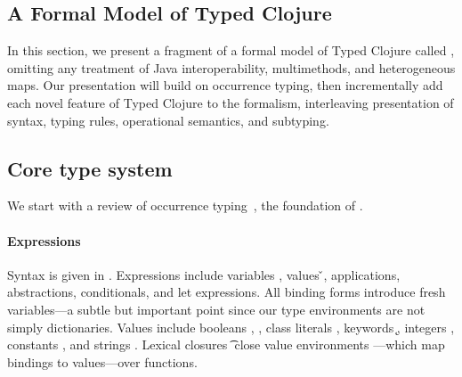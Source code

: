\subsection{A Formal Model of Typed Clojure}
\label{sec:formal}

In this section, we present a fragment of a formal model of
Typed Clojure called \lambdatc{}, omitting any treatment
of Java interoperability, multimethods, and heterogeneous maps.
%
%
Our presentation will build on occurrence typing, then incrementally add each
novel feature of Typed Clojure to the formalism,
interleaving presentation of syntax, typing rules, operational semantics,
and subtyping.

\subsection{Core type system}
\label{sec:coretypesystem}

We start with a review of
occurrence typing~\cite{TF10}, the foundation of \lambdatc{}.

\paragraph{Expressions} Syntax is given in . Expressions \e{} 
include variables \x{}, values \v{},
applications, abstractions, conditionals, and let expressions.
All binding forms introduce fresh variables---a subtle but important point since our type environments
are not simply dictionaries.
Values include booleans \bool{}, \nil{}, class literals {\class{}}, keywords \k{},
integers {\nat{}},
constants {\const{}}, and strings \str{}. Lexical closures {\closure {\openv{}} {\abs {\x{}} {\t{}} {\e{}}}}
close value environments \openv{}---which map bindings to values---over functions.

